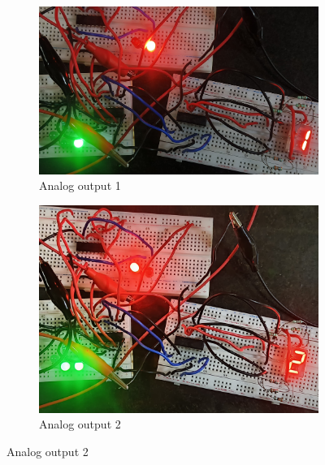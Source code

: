 \begin{figure}[H]
    \ContinuedFloat
    
    \begin{subfigure}{\linewidth}
        \includegraphics[width=1\textwidth]{images/1.jpg}
        \caption{Analog output 1}
    \end{subfigure}
    
    \bigskip
    \begin{subfigure}{\linewidth}
        \includegraphics[width=1\textwidth]{images/2.jpg}
        \caption{Analog output 2}
    \end{subfigure}
    

\end{figure}
